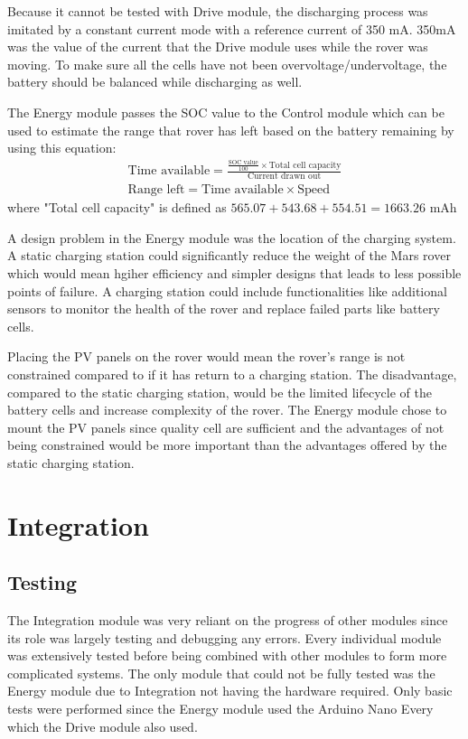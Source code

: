 \documentclass[11pt, a4paper]{article}
\begin{document}
Because it cannot be tested with Drive module, the discharging process was imitated by a constant current mode with a reference current of 350 mA. 350mA was the value of the current that the Drive module uses while the rover was moving. To make sure all the cells have not been overvoltage/undervoltage, the battery should be balanced while discharging as well.

The Energy module passes the SOC value to the Control module which can be used to estimate the range that rover has left based on the battery remaining by using this equation:
\begin{gather*}
    \text{Time available} = \frac{\frac{\text{SOC value}}{100} \times \text{Total cell capacity}}{\text{Current drawn out}} \\
    \text{Range left} = \text{Time available} \times \text{Speed}
\end{gather*}
where "Total cell capacity" is defined as $565.07 + 543.68 + 554.51 = 1663.26$ mAh

A design problem in the Energy module was the location of the charging system. A static charging station could significantly reduce the weight of the Mars rover which would mean hgiher efficiency and simpler designs that leads to less possible points of failure. A charging station could include functionalities like additional sensors to monitor the health of the rover and replace failed parts like battery cells. 

Placing the PV panels on the rover would mean the rover's range is not constrained compared to if it has return to a charging station. The disadvantage, compared to the static charging station, would be the limited lifecycle of the battery cells and increase complexity of the rover. The Energy module chose to mount the PV panels since quality cell are sufficient and the advantages of not being constrained would be more important than the advantages offered by the static charging station.



\pagebreak
\section{Integration}

\subsection{Testing}

The Integration module was very reliant on the progress of other modules since its role was largely testing and debugging any errors. Every individual module was extensively tested before being combined with other modules to form more complicated systems. The only module that could not be fully tested was the Energy module due to Integration not having the hardware required. Only basic tests were performed since the Energy module used the Arduino Nano Every which the Drive module also used. 
\end{document}

